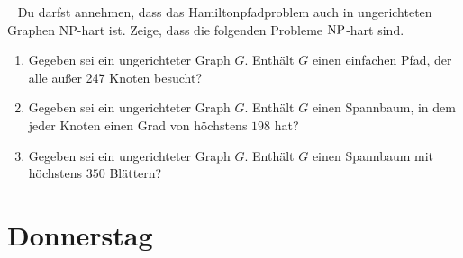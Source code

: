 \documentclass{uebung_cs}
\begin{document}
\begin{aufgabe}[$\NP$-Härte]\
	Du darfst annehmen, dass das Hamiltonpfadproblem auch in ungerichteten Graphen NP-hart ist.
	Zeige, dass die folgenden Probleme $\NP$-hart sind.
	\begin{enumerate}
		\item Gegeben sei ein ungerichteter Graph $G$. Enthält $G$ einen einfachen Pfad, der alle außer 247 Knoten besucht?
		\item Gegeben sei ein ungerichteter Graph $G$. Enthält $G$ einen Spannbaum, in dem jeder Knoten einen Grad von höchstens $198$ hat?
		\item Gegeben sei ein ungerichteter Graph $G$. Enthält $G$ einen Spannbaum mit höchstens $350$ Blättern?
	\end{enumerate}
\end{aufgabe}

\section*{Donnerstag}
\end{document}
